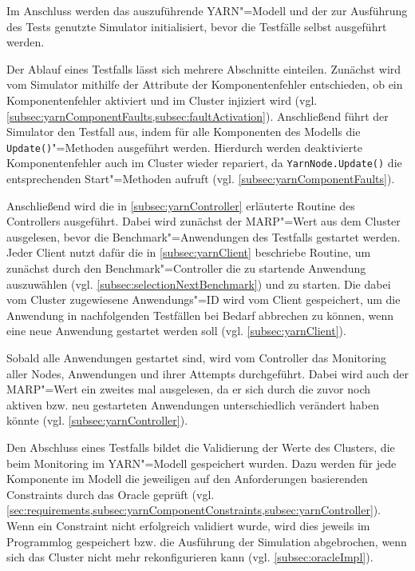 Im Anschluss werden das auszuführende YARN"=Modell und der zur Ausführung des Tests genutzte Simulator initialisiert, bevor die Testfälle selbst ausgeführt werden.

Der Ablauf eines Testfalls lässt sich mehrere Abschnitte einteilen.
Zunächst wird vom Simulator mithilfe der Attribute der Komponentenfehler entschieden, ob ein Komponentenfehler aktiviert und im Cluster injiziert wird (vgl. \cref{subsec:yarnComponentFaults,subsec:faultActivation}).
Anschließend führt der Simulator den Testfall aus, indem für alle Komponenten des Modells die \texttt{Update()}"=Methoden ausgeführt werden.
Hierdurch werden deaktivierte Komponentenfehler auch im Cluster wieder repariert, da \texttt{YarnNode.Update()} die entsprechenden Start"=Methoden aufruft (vgl. \cref{subsec:yarnComponentFaults}).

Anschließend wird die in \cref{subsec:yarnController} erläuterte Routine des Controllers ausgeführt.
Dabei wird zunächst der \gls{MARP}"=Wert aus dem Cluster ausgelesen, bevor die Benchmark"=Anwendungen des Testfalls gestartet werden.
Jeder Client nutzt dafür die in \cref{subsec:yarnClient} beschriebe Routine, um zunächst durch den Benchmark"=Controller die zu startende Anwendung auszuwählen (vgl. \cref{subsec:selectionNextBenchmark}) und zu starten.
Die dabei vom Cluster zugewiesene Anwendungs"=ID wird vom Client gespeichert, um die Anwendung in nachfolgenden Testfällen bei Bedarf abbrechen zu können, wenn eine neue Anwendung gestartet werden soll (vgl. \cref{subsec:yarnClient}).

Sobald alle Anwendungen gestartet sind, wird vom Controller das Monitoring aller Nodes, Anwendungen und ihrer Attempts durchgeführt.
Dabei wird auch der \gls{MARP}"=Wert ein zweites mal ausgelesen, da er sich durch die zuvor noch aktiven bzw. neu gestarteten Anwendungen unterschiedlich verändert haben könnte (vgl. \cref{subsec:yarnController}).

Den Abschluss eines Testfalls bildet die Validierung der Werte des Clusters, die beim Monitoring im YARN"=Modell gespeichert wurden.
Dazu werden für jede Komponente im Modell die jeweiligen auf den Anforderungen basierenden Constraints durch das Oracle geprüft (vgl. \cref{sec:requirements,subsec:yarnComponentConstraints,subsec:yarnController}).
Wenn ein Constraint nicht erfolgreich validiert wurde, wird dies jeweils im Programmlog gespeichert bzw. die Ausführung der Simulation abgebrochen, wenn sich das Cluster nicht mehr rekonfigurieren kann (vgl. \cref{subsec:oracleImpl}).

